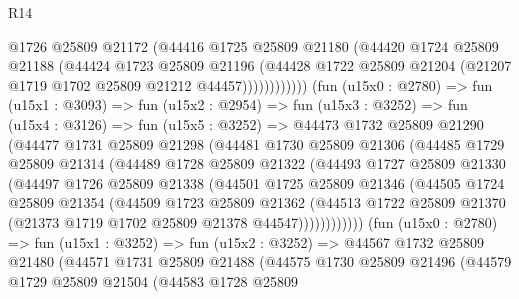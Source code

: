 \begin{lexlean}{R14}
\begin{coremodule}
                      @1726
                      @25809
                      @21172
                      (@44416
                        @1725
                        @25809
                        @21180
                        (@44420
                          @1724
                          @25809
                          @21188
                          (@44424
                            @1723
                            @25809
                            @21196
                            (@44428
                              @1722
                              @25809
                              @21204
                              (@21207 @1719 @1702 @25809 @21212 @44457))))))))))))
        (fun (u15x0 : @2780) =>
        fun (u15x1 : @3093) =>
        fun (u15x2 : @2954) =>
        fun (u15x3 : @3252) =>
        fun (u15x4 : @3126) =>
        fun (u15x5 : @3252) =>
        @44473
          @1732
          @25809
          @21290
          (@44477
            @1731
            @25809
            @21298
            (@44481
              @1730
              @25809
              @21306
              (@44485
                @1729
                @25809
                @21314
                (@44489
                  @1728
                  @25809
                  @21322
                  (@44493
                    @1727
                    @25809
                    @21330
                    (@44497
                      @1726
                      @25809
                      @21338
                      (@44501
                        @1725
                        @25809
                        @21346
                        (@44505
                          @1724
                          @25809
                          @21354
                          (@44509
                            @1723
                            @25809
                            @21362
                            (@44513
                              @1722
                              @25809
                              @21370
                              (@21373 @1719 @1702 @25809 @21378 @44547))))))))))))
        (fun (u15x0 : @2780) =>
        fun (u15x1 : @3252) =>
        fun (u15x2 : @3252) =>
        @44567
          @1732
          @25809
          @21480
          (@44571
            @1731
            @25809
            @21488
            (@44575
              @1730
              @25809
              @21496
              (@44579
                @1729
                @25809
                @21504
                (@44583
                  @1728
                  @25809

\end{coremodule}
\end{lexlean}
